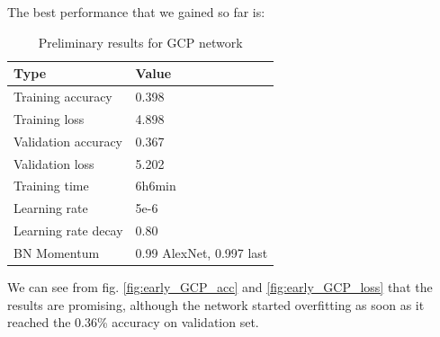 The best performance that we gained so far is:
\begin{table}[!ht]
    \begin{center}
        \label{tab:GCP_early_results}
        \begin{tabular}{l|l}
            \rowcolor{gray!50}
            \textbf{Type} & \textbf{Value} \\
            \hline
            Training accuracy & 0.398\\
            Training loss & 4.898\\
            Validation accuracy & 0.367\\
            Validation loss & 5.202\\
            Training time & 6h6min\\
            Learning rate & 5e-6\\
            Learning rate decay & 0.80\\
            BN Momentum & 0.99 AlexNet, 0.997 last\\
            \hline
        \end{tabular}
    \end{center}
    \caption{Preliminary results for GCP network}
\end{table}
We can see from fig. \ref{fig:early_GCP_acc} and \ref{fig:early_GCP_loss} that the results are promising, although the network started overfitting as soon as it reached the 0.36\% accuracy on validation set.

